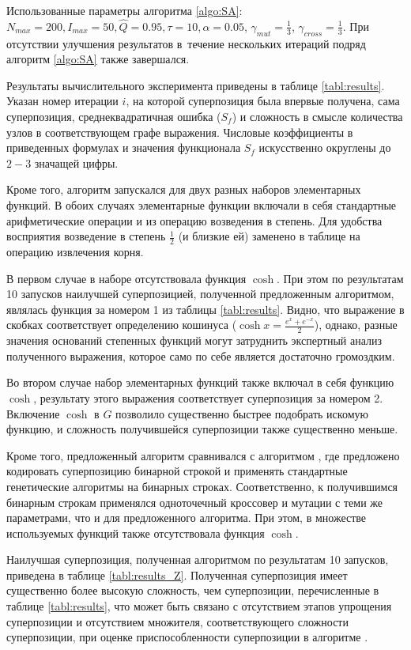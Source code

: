 \documentclass[12pt,a4paper]{article}
\begin{document}
Использованные параметры алгоритма \ref{algo:SA}: $N_{max} = 200, I_{max} = 50,
\hat{Q} = 0.95, \tau = 10, \alpha = 0.05$, $\gamma_{mut} = \frac{1}{3}$,
$\gamma_{cross} = \frac{1}{3}$. При отсутствии улучшения результатов в~течение
нескольких итераций подряд алгоритм \ref{algo:SA} также завершался.

Результаты вычислительного эксперимента приведены в таблице \ref{tabl:results}.
Указан номер итерации $i$, на которой суперпозиция была впервые
получена, сама суперпозиция, среднеквадратичная ошибка ($S_f$) и сложность в
смысле количества узлов в соответствующем графе выражения. Числовые коэффициенты
в приведенных формулах и значения функционала $S_f$ искусственно округлены до
$2-3$ значащей цифры.

Кроме того, алгоритм запускался для двух разных наборов элементарных функций.
В обоих случаях элементарные функции включали в себя стандартные арифметические операции и
из операцию возведения в степень. Для удобства восприятия возведение в степень
$\frac{1}{2}$ (и близкие ей) заменено в таблице на операцию извлечения корня.

В первом случае в наборе отсутствовала функция $\cosh$. При этом по результатам
10 запусков наилучшей суперпозицией, полученной предложенным алгоритмом,
являлась функция за номером 1 из таблицы \ref{tabl:results}. Видно, что выражение
в скобках соответствует определению кошинуса ($\cosh x = \frac{e^x + e^{-x}}{2}$),
однако, разные значения оснований степенных функций могут затруднить экспертный
анализ полученного выражения, которое само по себе является достаточно громоздким.

Во втором случае набор элементарных функций также включал в себя функцию
$\cosh$, результату этого выражения соответствует суперпозиция за номером 2.
Включение $\cosh$ в $G$ позволило существенно быстрее подобрать искомую функцию, и сложность
получившейся суперпозиции также существенно меньше.

Кроме того, предложенный алгоритм сравнивался с алгоритмом \cite{Zelinka2008},
где предложено кодировать суперпозицию бинарной строкой и применять стандартные
генетические алгоритмы на бинарных строках. Соответственно, к получившимся
бинарным строкам применялся одноточечный кроссовер и мутации с теми же
параметрами, что и для предложенного алгоритма. При этом, в множестве используемых
функций также отсутствовала функция $\cosh$.

Наилучшая суперпозиция, полученная алгоритмом \cite{Zelinka2008} по результатам
10 запусков, приведена в таблице \ref{tabl:results_Z}. Полученная суперпозиция
имеет существенно более высокую сложность, чем суперпозиции, перечисленные в
таблице \ref{tabl:results}, что может быть связано с отсутствием этапов упрощения
суперпозиции и отсутствием множителя, соответствующего сложности суперпозиции,
при оценке приспособленности суперпозиции в алгоритме \cite{Zelinka2008}.
\end{document}
